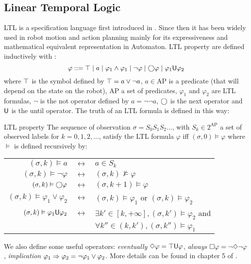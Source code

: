\subsection{Linear Temporal Logic}
\newcommand{\AP}{\mathrm{AP}}
LTL is a specification language first introduced in \cite{pnueli1977temporal}. Since then it has been widely used in robot motion and action planning mainly for its expressiveness and mathematical equivalent representation in \buchi{} Automaton.
LTL property are defined inductively with :
\begin{equation}
\varphi ::= 
\top \mid 
a \mid 
\varphi_1 \land \varphi_1 \mid
\lnot \varphi \mid
\bigcirc \varphi \mid
\varphi_1 \mathsf{U} \varphi_2
\end{equation}
where $\top$ is the symbol defined by $\top = a\lor \lnot a$, $a \in \AP$ is a predicate (that will depend on the state on the robot), $\AP$ a set of predicates, $\varphi_1$ and $\varphi_2$ are LTL formulas, $\lnot$ is the not operator defined by $a = \lnot \lnot a$, $\bigcirc$ is the next operator and $\mathsf{U}$ is the until operator.
The truth of an LTL formula is defined in this way:
\begin{nameddef}{LTL property}
The sequence of observation $\sigma = S_0 S_1 S_2 ...$, with $S_k \in 2^{\AP}$ a set of observed labels for $k=0,1,2,...$, satisfy the LTL formula $\varphi$ iff $(\sigma,0) \vDash \varphi$ where $\vDash$ is defined recursively by: 

\begin{tabular}[b]{rcl}
$(\sigma,k) \vDash a$ & $\leftrightarrow$ & $a \in S_k$\\
$(\sigma,k) \vDash \lnot \varphi$ & $\leftrightarrow$ &  $(\sigma,k) \nvDash  \varphi$ \\
$(\sigma,k) \vDash \bigcirc \varphi$ & $\leftrightarrow$ &  $(\sigma,k+1) \vDash  \varphi$ \\
$(\sigma,k) \vDash \varphi_1 \lor \varphi_2$ & $\leftrightarrow$ &  $(\sigma,k) \vDash  \varphi_1$ or $(\sigma,k) \vDash  \varphi_2$ \\
$(\sigma,k) \vDash \varphi_1 \mathsf{U} \varphi_2$ & $\leftrightarrow$ &  $\exists k' \in \left [k, +\infty \right ] , (\sigma,k') \vDash \varphi_2$ and \\
& & $\forall k'' \in (k,k'), (\sigma,k'') \vDash \varphi_1$ \\
\end{tabular}
\end{nameddef}

We also define some useful operators: \textit{eventually} $\Diamond \varphi = \top \mathsf{U} \varphi$, \textit{always} $\square \varphi = \lnot \Diamond \lnot \varphi$, \textit{implication} $\varphi_1 \Rightarrow \varphi_2 = \lnot \varphi_1 \lor \varphi_2$.
More details can be found in chapter 5 of \cite{principlemodelchecking}.

